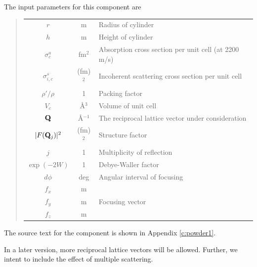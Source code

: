 The input parameters for this component are
%
\begin{quote}\begin{tabular}{ccl}
$r$ & m & Radius of cylinder \\
$h$ & m & Height of cylinder \\
$\sigma_c^a$ & fm$^2$ & Absorption cross section per unit cell (at 2200 m/s) \\
$\sigma_{i,c}^s$ & (fm)$^2$ & Incoherent scattering cross section per unit cell \\
$\rho'/\rho$ & 1 & Packing factor \\
$V_c$ & \AA$^3$ & Volume of unit cell \\
${\bf Q}$ & \AA$^{-1}$ & The reciprocal lattice vector under consideration \\
$|F({\bf Q}_j)|^2$ & (fm)$^2$ &
 Structure factor \\
$j$ & 1 & Multiplicity of reflection \\
$\exp(-2W)$ & 1 & Debye-Waller factor \\
$d\phi$ & deg & Angular interval of focusing \\ 
$f_x$ & m & \\
$f_y$ & m & Focusing vector\\
$f_z$ & m & \\
\end{tabular}\end{quote}
%
The source text for the component is shown in Appendix
\ref{c:powder1}.

In a later version, more reciprocal lattice vectors will be
allowed. Further, we intent to include the effect of multiple
scattering.

